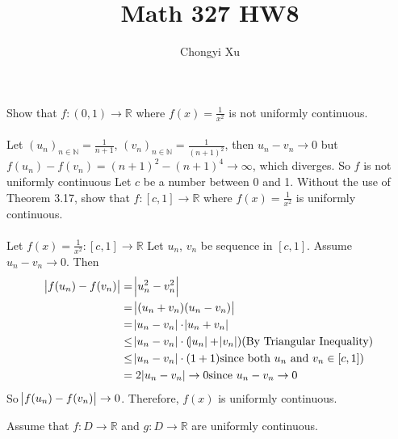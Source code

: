 \documentclass[]{exam}
\title{}
\title{Math 327 HW8}
\author{Chongyi Xu}
\begin{document}
	
\maketitle
\begin{questions}
\question Show that $f:(0,1)\to\mathbb{R}$ where $f(x) = \frac{1}{x^2}$ is not uniformly continuous.
\\
\\ Let $(u_n)_{n\in\mathbb{N}} = \frac{1}{n + 1}$, $(v_n)_{n\in\mathbb{N}} = \frac{1}{(n + 1)^2}$, then $u_n - v_n \to 0$ but $f(u_n) - f(v_n) = (n + 1)^2 - (n + 1)^4 \to\infty$, which diverges. So $f$ is not uniformly continuous
\question Let $c$ be a number between 0 and 1. Without the use of Theorem 3.17, show that $f:[c, 1]\to\mathbb{R}$ where $f(x) = \frac{1}{x^2}$ is uniformly continuous. 
\\
\\ Let $f(x) = \frac{1}{x^2}:[c, 1]\to\mathbb{R}$ Let $u_n$, $v_n$ be sequence in $[c, 1]$. Assume $u_n - v_n \to 0$. Then
\begin{equation*}
\begin{split}
	\abs{f(u_n) - f(v_n)} 	&= \abs{u_n^2 - v_n^2} \\
							&= \abs{(u_n + v_n)(u_n - v_n)} \\
							&= \abs{u_n - v_n}\cdot\abs{u_n + v_n} \\
							&\leq \abs{u_n - v_n}\cdot(\abs{u_n} + \abs{v_n}) \text{(By Triangular Inequality)} \\
							&\leq \abs{u_n - v_n}\cdot(1 + 1) \text{since both $u_n$ and $v_n\in[c, 1]$)} \\
							&= 2\abs{u_n - v_n} \to 0 \text{since }u_n - v_n\to 0
\end{split}
\end{equation*}
So $\abs{f(u_n) - f(v_n)}\to 0$. Therefore, $f(x)$ is uniformly continuous.

\question Assume that $f:D\to\mathbb{R}$ and $g:D\to\mathbb{R}$ are uniformly continuous.
\end{questions}
\end{document}
